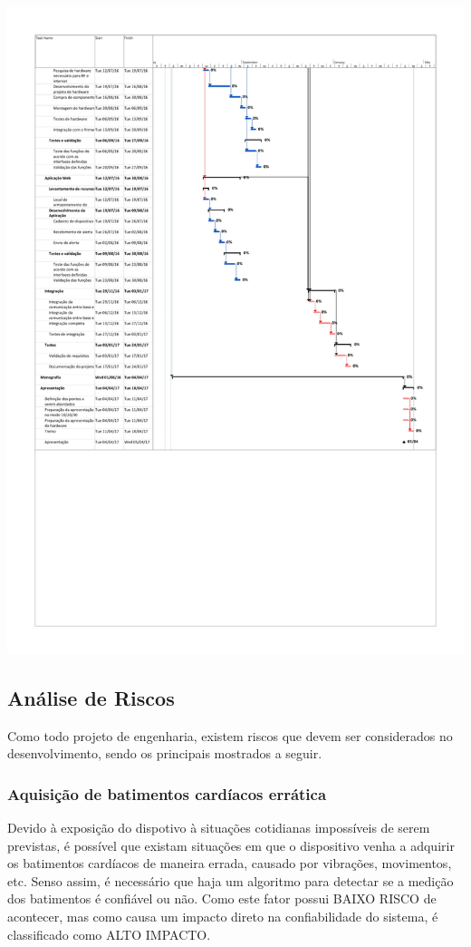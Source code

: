 \documentclass[a4paper]{article}
\begin{document}
\begin{center}
\includegraphics[scale=0.29]{figuras/Cronograma-2.png}
\end{center}
\subsection{Análise de Riscos}
Como todo projeto de engenharia, existem riscos que devem ser considerados no desenvolvimento, sendo os principais mostrados a seguir.

\subsubsection{Aquisição de batimentos cardíacos errática}
Devido à exposição do dispotivo à situações cotidianas impossíveis de serem previstas, é possível que existam situações em que o dispositivo venha a adquirir os batimentos cardíacos de maneira errada, causado por vibrações, movimentos, etc. Senso assim, é necessário que haja um algoritmo para detectar se a medição dos batimentos é confiável ou não. Como este fator possui BAIXO RISCO de acontecer, mas como causa um impacto direto na confiabilidade do sistema, é classificado como ALTO IMPACTO.
\end{document}
